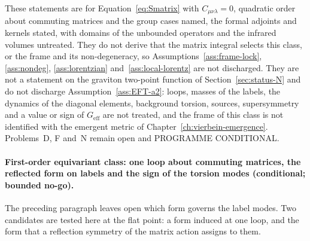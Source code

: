 These statements are for Equation~\eqref{eq:Smatrix} with \(C_{\mu\nu\lambda}=0\), quadratic order about commuting matrices and the group cases named, the formal adjoints and kernels stated, with domains of the unbounded operators and the infrared volumes untreated. They do not derive that the matrix integral selects this class, or the frame and its non-degeneracy, so Assumptions~\ref{ass:frame-lock}, \ref{ass:nondeg}, \ref{ass:lorentzian} and~\ref{ass:local-lorentz} are not discharged. They are not a statement on the graviton two-point function of Section~\ref{sec:status-N} and do not discharge Assumption~\ref{ass:EFT-a2}: loops, masses of the labels, the dynamics of the diagonal elements, background torsion, sources, supersymmetry and a value or sign of \(G_{\mathrm{eff}}\) are not treated, and the frame of this class is not identified with the emergent metric of Chapter~\ref{ch:vierbein-emergence}. Problems~D, F and~N remain open and PROGRAMME CONDITIONAL.

\paragraph{First-order equivariant class: one loop about commuting matrices, the reflected form on labels and the sign of the torsion modes (conditional; bounded no-go).}
The preceding paragraph leaves open which form governs the label modes. Two candidates are tested here at the flat point: a form induced at one loop, and the form that a reflection symmetry of the matrix action assigns to them.

